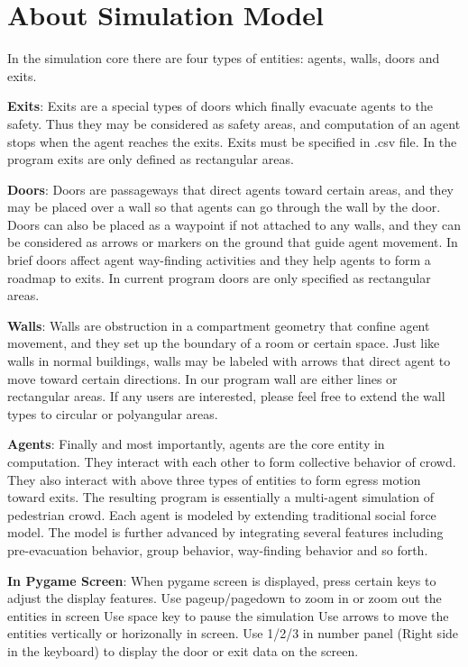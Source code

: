 \documentclass{article}
\begin{document}
\section{About Simulation Model}

In the simulation core there are four types of entities: agents, walls, doors and exits.

\textbf{Exits}: Exits are a special types of doors which finally evacuate agents to the safety.  Thus they may be considered as safety areas, and computation of an agent stops when the agent reaches the exits.  Exits must be specified in .csv file.  In the program exits are only defined as rectangular areas.

\textbf{Doors}: Doors are passageways that direct agents toward certain areas, and they may be placed over a wall so that agents can go through the wall by the door.  Doors can also be placed as a waypoint if not attached to any walls, and they can be considered as arrows or markers on the ground that guide agent movement.  In brief doors affect agent way-finding activities and they help agents to form a roadmap to exits.  In current program doors are only specified as rectangular areas.

\textbf{Walls}: Walls are obstruction in a compartment geometry that confine agent movement, and they set up the boundary of a room or certain space.  Just like walls in normal buildings, walls may be labeled with arrows that direct agent to move toward certain directions.  In our program wall are either lines or rectangular areas.  If any users are interested, please feel free to extend the wall types to circular or polyangular areas.

\textbf{Agents}: Finally and most importantly, agents are the core entity in computation.  They interact with each other to form collective behavior of crowd.  They also interact with above three types of entities to form egress motion toward exits.  The resulting program is essentially a multi-agent simulation of pedestrian crowd.  Each agent is modeled by extending traditional social force model.  The model is further advanced by integrating several features including pre-evacuation behavior, group behavior, way-finding behavior and so forth.


\textbf{In Pygame Screen}: When pygame screen is displayed, press certain keys to adjust the display features.  
Use pageup/pagedown to zoom in or zoom out the entities in screen
Use space key to pause the simulation
Use arrows to move the entities vertically or horizonally in screen.
Use 1/2/3 in number panel (Right side in the keyboard) to display the door or exit data on the screen.   
\end{document}
